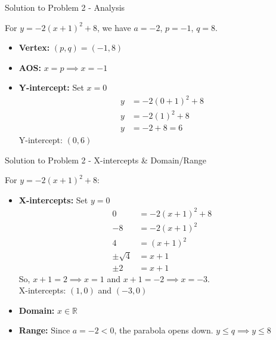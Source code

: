 \documentclass[aspectratio=169]{beamer}
\begin{document}
\begin{frame}{Solution to Problem 2 - Analysis}
    \begin{tcolorbox}[colback=lightgray,colframe=accent,title=Solution 2]
        \footnotesize
        For $y = -2(x+1)^2 + 8$, we have $a=-2$, $p=-1$, $q=8$.
        \begin{itemize}
            \item \textbf{Vertex:} $(p,q) = (-1,8)$
            \item \textbf{AOS:} $x = p \implies x = -1$
            \item \textbf{Y-intercept:} Set $x=0$
                \begin{align*}
                    y &= -2(0+1)^2 + 8 \\
                    y &= -2(1)^2 + 8 \\
                    y &= -2 + 8 = 6
                \end{align*}
                Y-intercept: $(0,6)$
        \end{itemize}
    \end{tcolorbox}
\end{frame}

\begin{frame}{Solution to Problem 2 - X-intercepts & Domain/Range}
    \begin{tcolorbox}[colback=lightgray,colframe=accent,title=Solution 2 (Cont.)]
        \footnotesize
        For $y = -2(x+1)^2 + 8$:
        \begin{itemize}
            \item \textbf{X-intercepts:} Set $y=0$
                \begin{align*}
                    0 &= -2(x+1)^2 + 8 \\
                    -8 &= -2(x+1)^2 \\
                    4 &= (x+1)^2 \\
                    \pm\sqrt{4} &= x+1 \\
                    \pm 2 &= x+1
                \end{align*}
                So, $x+1=2 \implies x=1$ and $x+1=-2 \implies x=-3$.\\
                X-intercepts: $(1,0)$ and $(-3,0)$
            \item \textbf{Domain:} $x \in \mathbb{R}$
            \item \textbf{Range:} Since $a=-2<0$, the parabola opens down. $y \leq q \implies y \leq 8$
        \end{itemize}
    \end{tcolorbox}
\end{frame}
\end{document}

